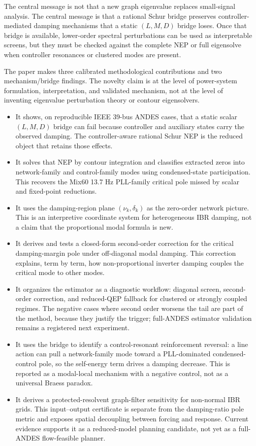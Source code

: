 \documentclass[journal]{IEEEtran}
\begin{document}
The central message is not that a new graph eigenvalue replaces small-signal analysis. The central message is that a rational Schur bridge preserves controller-mediated damping mechanisms that a static $(L,M,D)$ bridge loses. Once that bridge is available, lower-order spectral perturbations can be used as interpretable screens, but they must be checked against the complete NEP or full eigensolve when controller resonances or clustered modes are present.

The paper makes three calibrated methodological contributions and two mechanism/bridge findings. The novelty claim is at the level of power-system formulation, interpretation, and validated mechanism, not at the level of inventing eigenvalue perturbation theory or contour eigensolvers.

\begin{itemize}
\item It shows, on reproducible IEEE 39-bus ANDES cases, that a static scalar $(L,M,D)$ bridge can fail because controller and auxiliary states carry the observed damping. The controller-aware rational Schur NEP is the reduced object that retains those effects.
\item It solves that NEP by contour integration and classifies extracted zeros into network-family and control-family modes using condensed-state participation. This recovers the Mix60 13.7 Hz PLL-family critical pole missed by scalar and fixed-point reductions.
\item It uses the damping-region plane $(\nu_k,\delta_k)$ as the zero-order network picture. This is an interpretive coordinate system for heterogeneous IBR damping, not a claim that the proportional modal formula is new.
\item It derives and tests a closed-form second-order correction for the critical damping-margin pole under off-diagonal modal damping. This correction explains, term by term, how non-proportional inverter damping couples the critical mode to other modes.
\item It organizes the estimator as a diagnostic workflow: diagonal screen, second-order correction, and reduced-QEP fallback for clustered or strongly coupled regimes. The negative cases where second order worsens the tail are part of the method, because they justify the trigger; full-ANDES estimator validation remains a registered next experiment.
\item It uses the bridge to identify a control-resonant reinforcement reversal: a line action can pull a network-family mode toward a PLL-dominated condensed-control pole, so the self-energy term drives a damping decrease. This is reported as a modal-local mechanism with a negative control, not as a universal Braess paradox.
\item It derives a protected-resolvent graph-filter sensitivity for non-normal IBR grids. This input--output certificate is separate from the damping-ratio pole metric and exposes spatial decoupling between forcing and response. Current evidence supports it as a reduced-model planning candidate, not yet as a full-ANDES flow-feasible planner.
\end{itemize}
\end{document}
